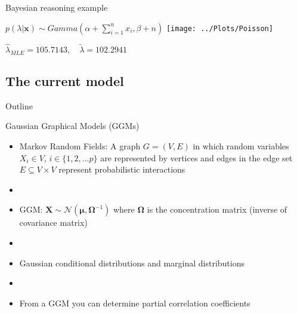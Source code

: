\documentclass[xcolor=dvipsnames]{beamer}
\begin{document}
\begin{frame}{Bayesian reasoning example}
	\vspace{-5pt}
	\begin{center}
		$p(\lambda|\textbf{x})\sim Gamma(\alpha+ \sum_{i=1}^n x_i, \beta+n)$
		\texttt{[image: ../Plots/Poisson]}
		
		$\hat{\lambda}_{MLE}=105.7143, \quad \tilde{\lambda}=102.2941$
	\end{center}
\end{frame}

\subsection{The current model}
\begin{frame}{Outline}
	\vspace{-10.5pt}
	\tableofcontents[currentsection,subsectionstyle=show/shaded/hide]
\end{frame}

\begin{frame}{Gaussian Graphical Models (GGMs)}
	\vspace{-5.5pt}
	\begin{itemize}
		\item Markov Random Fields: A graph $G=(V,E)$ in which random variables $X_i\in V$, $i\in \{1,2,...p\}$ are represented by vertices and edges in the edge set $E \subseteq V \times V$ represent probabilistic interactions \pause
		\item[]
		\item GGM: $\textbf{X}\sim \mathcal{N}(\boldsymbol{\mu},\boldsymbol{\Omega}^{-1})$ where $\boldsymbol{\Omega}$ is the concentration matrix (inverse of covariance matrix) \pause
		\item[]
		\item Gaussian conditional distributions and marginal distributions \pause
		\item[]
		\item From a GGM you can determine partial correlation coefficients 
	\end{itemize}
\end{frame}
\end{document}

